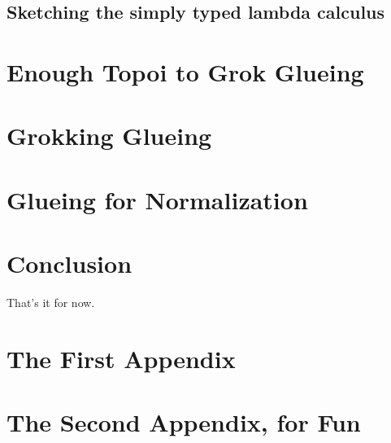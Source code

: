 \documentclass[12pt,twoside]{reedthesis}
\theoremstyle{definition}
\theoremstyle{remark}
\theoremstyle{plain}
\begin{document}
\section{Sketching the simply typed lambda calculus}


\chapter{Enough Topoi to Grok Glueing}
\chapter{Grokking Glueing}
\chapter{Glueing for Normalization}

\chapter*{Conclusion}
\setcounter{chapter}{4}
\setcounter{section}{0}

That's it for now.

\appendix
\chapter{The First Appendix}
\chapter{The Second Appendix, for Fun}



\backmatter%

\nocite{*}


% 


\end{document}

